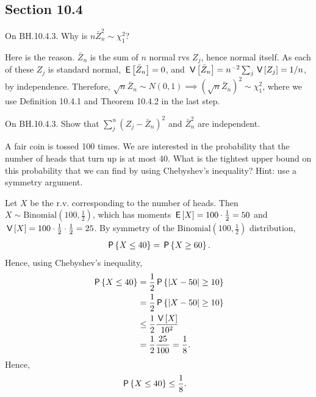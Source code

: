 \subsection*{Section 10.4}
\label{sec:section-10.4}

\begin{exercise}
On BH.10.4.3. Why is $n \bar Z_n^2\sim \chi_1^2$?
\begin{hint}
\end{hint}
\begin{solution}
Here is the reason.
$\bar Z_n$ is the sum of $n$ normal rvs $Z_j$, hence normal itself.
As each of these $Z_j$ is standard normal, $\E{\bar Z_n}=0$, and $\V{\bar Z_n}=n^{-2}\sum_{j} \V{Z_{j}}=1/n$, by independence.
Therefore, $\sqrt{n} \bar Z_{n} \sim N(0,1) \implies (\sqrt{n}\bar Z_n)^2 \sim \chi_1^2$, where we use Definition 10.4.1 and Theorem 10.4.2 in the last step.
\end{solution}
\end{exercise}

\begin{exercise}
On BH.10.4.3. Show that $\sum_j^n (Z_j-\bar Z_n)^2$ and $\bar Z_n^2$ are independent.
\begin{hint}
\end{hint}
\begin{solution}
\end{solution}
\end{exercise}

\begin{exercise}
A fair coin is tossed 100 times. We are interested in the probability that the number of heads that turn up is at most 40. What is the tightest upper bound on this probability that we can find by using Chebyshev's inequality? Hint: use a symmetry argument.
\begin{solution}
Let $X$ be the r.v. corresponding to the number of heads. Then $X\sim \text{Binomial}\left(100,\frac12\right)$, which has moments $\E{X} = 100 \cdot \frac{1}{2} = 50$ and $\V{X} = 100 \cdot \frac{1}{2} \cdot \frac{1}{2} = 25$. By symmetry of the $\text{Binomial}\left(100,\frac12\right)$ distribution,
\begin{align}
    \P{ X \leq 40} = \P{ X \geq 60 }.
\end{align}
Hence, using Chebyshev's inequality,
\begin{align}
    \P{ X \leq 40} &= \frac{1}{2}  \P{ |X - 50| \geq 10 } \\
    &= \frac{1}{2} \P{ |X - 50| \geq 10 } \\
    &\leq \frac{1}{2} \frac{\V{X}}{10^2} \\
    &= \frac{1}{2} \frac{25}{100} = \frac{1}{8}.
\end{align}
Hence,
\begin{align}
    \P{ X \leq 40} &\leq \frac{1}{8}.
\end{align}
\end{solution}
\end{exercise}


